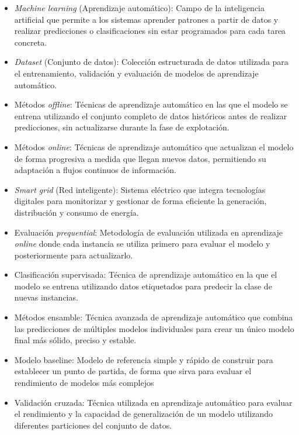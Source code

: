 \documentclass[12pt,a4paper]{report}
\begin{document}
\begin{itemize}
\item \emph{Machine learning} (Aprendizaje automático): Campo de la inteligencia artificial que permite a los sistemas aprender patrones a partir de datos y realizar predicciones o clasificaciones sin estar programados para cada tarea concreta.

\item \emph{Dataset} (Conjunto de datos): Colección estructurada de datos utilizada para el entrenamiento, validación y evaluación de modelos de aprendizaje automático.

\item Métodos \emph{offline}: Técnicas de aprendizaje automático en las que el modelo se entrena utilizando el conjunto completo de datos históricos antes de realizar predicciones, sin actualizarse durante la fase de explotación.

\item Métodos \emph{online}: Técnicas de aprendizaje automático que actualizan el modelo de forma progresiva a medida que llegan nuevos datos, permitiendo su adaptación a flujos continuos de información.

\item \emph{Smart grid} (Red inteligente):  Sistema eléctrico que integra tecnologías digitales para monitorizar y gestionar de forma eficiente la generación, distribución y consumo de energía.

\item Evaluación \emph{prequential}: Metodología de evaluación utilizada en aprendizaje \emph{online} donde cada instancia se utiliza primero para evaluar el modelo y posteriormente para actualizarlo.

\item Clasificación supervisada: Técnica de aprendizaje automático en la que el modelo se entrena utilizando datos etiquetados para predecir la clase de nuevas instancias.

\item Métodos ensamble: Técnica avanzada de aprendizaje automático que combina las predicciones de múltiples modelos individuales para crear un único modelo final más sólido, preciso y estable.

\item Modelo baseline: Modelo de referencia simple y rápido de construir para establecer un punto de partida, de forma que sirva para evaluar el rendimiento de modelos más complejos

\item Validación cruzada: Técnica utilizada en aprendizaje automático para evaluar el rendimiento y la capacidad de generalización de un modelo utilizando diferentes particiones del conjunto de datos.


\end{itemize}
\end{document}

